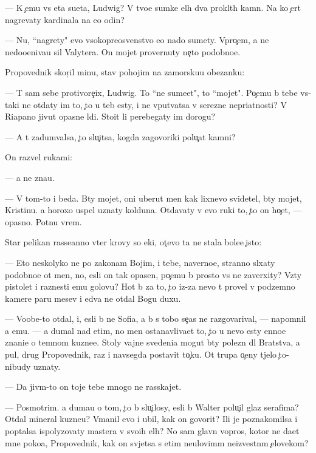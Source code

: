 \documentclass[10pt]{book}
\begin{document}
— K {\c}emu vs{\ia} eta su{\y}eta, Ludwig? V tvo{\y}e{\y} sumke {\q}el{\yi}h dva prokl{\ia}t{\yi}h kamn{\ia}. Na ko{\y} {\c}ert nagrevaty kardinala na {\y}e{\x}o odin?

— Nu, ``nagrety" {\y}evo v{\yi}sokopreosv{\ia}{\x}enstvo {\y}e{\x}o nado sumety. Vpro{\c}em, {\y}a ne nedoo{\q}eniva{\y}u sil{\yi} Valytera. On mojet provernuty ne{\c}to podobno{\y}e.

Propovednik skor{\c}il minu, stav pohojim na zamorsku{\y}u obez{\y}anku:

— T{\yi} sam sebe protivore{\c}ix, Ludwig. To ``ne sume{\y}et", to ``mojet". Po{\c}emu b{\yi} tebe vs{\e}-taki ne otdaty im to, {\c}to u teb{\ia} {\y}esty, i ne vput{\yi}vatsa v ser{\y}ezn{\yi}{\y}e nepri{\y}atnosti? V Riapano jivut opasn{\yi}{\y}e l{\iu}di. Sto{\y}it li perebegaty im dorogu?

— A t{\yi} zadum{\yi}valsa, {\c}to slu{\c}itsa, kogda zagovor{\x}iki polu{\c}at kamni?

On razvel rukami:

— {\Y}a ne zna{\y}u.

— V tom-to i beda. B{\yi}ty mojet, oni uberut men{\ia} kak lixnevo svidetel{\ia}, b{\yi}ty mojet, Kristinu. {\Y}a horoxo uspel uznaty kolduna. Otdavaty v {\y}evo ruki to, {\c}to on ho{\c}et, — opasno. Pot{\ia}nu vrem{\ia}.

Star{\yi}{\y} pelikan rasse{\y}anno v{\yi}ter krovy so {\x}eki, ot{\c}evo ta ne stala bole{\y}e {\c}isto{\y}:

— Eto neskolyko ne po zakonam Boj{\yf}im, i tebe, naverno{\y}e, stranno sl{\yi}xaty podobno{\y}e ot men{\ia}, no, {\y}esli on tak opasen, po{\c}emu b{\yi} prosto vs{\e} ne zaverxity? Vz{\ia}ty pistolet i raznesti {\y}emu golovu? Hot{\ia} b{\yi} za to, {\c}to iz-za nevo t{\yi} provel v podzemno{\y} kamere paru mes{\ia}{\q}ev i {\y}edva ne otdal Bogu duxu.

— Voob{\x}e-to otdal, i, {\y}esli b{\yi} ne Sofi{\y}a, {\y}a b{\yi} s tobo{\y} se{\y}{\c}as ne razgovarival, — napomnil {\y}a {\y}emu. — {\Y}a dumal nad etim, no men{\ia} ostanavliva{\y}et to, {\c}to u nevo {\y}esty {\q}enno{\y}e znani{\y}e o temnom kuzne{\q}e. Stoly vajn{\yi}{\y}e svedeni{\y}a mogut b{\yi}ty polezn{\yi} dl{\ia} Bratstva, a pul{\ia}, drug Propovednik, raz i navsegda postavit to{\c}ku. Ot trupa o{\c}eny t{\ia}jelo {\c}to-nibudy uznaty.

— Da jiv{\yi}m-to on toje tebe mnogo ne rasskajet.

— Posmotrim. {\Y}a duma{\y}u o tom, {\c}to b{\yi} slu{\c}ilosy, {\y}esli b{\yi} Walter polu{\c}il glaz serafima? Otdal mineral kuzne{\q}u? V{\yi}manil {\y}evo i ubil, kak on govorit? Ili je poznakomilsa i pop{\yi}talsa ispolyzovaty mastera v svo{\y}ih {\q}el{\ia}h? No sam{\yi}{\y} glavn{\yi}{\y} vopros, kotor{\yi}{\y} ne da{\y}et mne poko{\y}a, Propovednik, kak on sv{\ia}jetsa s etim neulovim{\yi}m ne{\y}izvestn{\yi}m {\c}elovekom?
\end{document}
